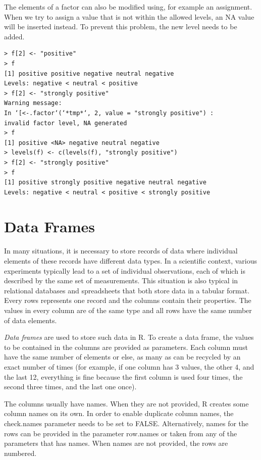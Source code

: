 The elements of a factor can also be modified using, for example an assignment. When we try to assign a value that is not within the allowed levels, an NA
value will be inserted instead. To prevent this problem, the new level needs to be
added.

\begin{verbatim}
> f[2] <- "positive"
> f
[1] positive positive negative neutral negative
Levels: negative < neutral < positive
> f[2] <- "strongly positive"
Warning message:
In ‘[<-.factor‘(‘*tmp*‘, 2, value = "strongly positive") :
invalid factor level, NA generated
> f
[1] positive <NA> negative neutral negative
> levels(f) <- c(levels(f), "strongly positive")
> f[2] <- "strongly positive"
> f
[1] positive strongly positive negative neutral negative
Levels: negative < neutral < positive < strongly positive
\end{verbatim}

\section{Data Frames}

In many situations, it is necessary to store records of data where individual elements of these records have different data types. In a scientific context, various
experiments typically lead to a set of individual observations, each of which is
described by the same set of measurements. This situation is also typical in relational databases and spreadsheets that both store data in a tabular format. Every rows represents one record and the columns contain their properties. The values
in every column are of the same type and all rows have the same number of data
elements.

\textit{Data frames} are used to store such data in R. To create a data frame, the
values to be contained in the columns are provided as parameters. Each column
must have the same number of elements or else, as many as can be recycled by
an exact number of times (for example, if one column has 3 values, the other 4,
and the last 12, everything is fine because the first column is used four times, the
second three times, and the last one once).

The columns usually have names. When they are not provided, R creates
some column names on its own. In order to enable duplicate column names, the
check.names parameter needs to be set to FALSE. Alternatively, names for the
rows can be provided in the parameter row.names or taken from any of the parameters that has names. When names are not provided, the rows are numbered.

